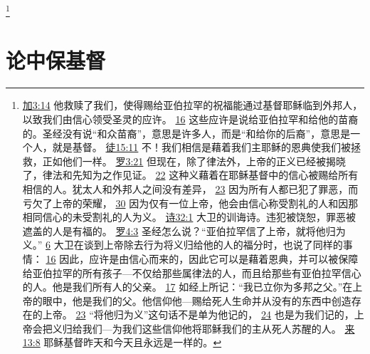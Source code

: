 \documentclass[12pt, a4paper, oneside]{ctexart}
\begin{document}
	\footnote {
		\href{https://biblehub.com/galatians/3-14.htm}{加3:14} 他救赎了我们，使得赐给亚伯拉罕的祝福能通过基督耶稣临到外邦人，以致我们由信心领受圣灵的应许。
		\href{https://biblehub.com/galatians/3-16.htm}{16} 这些应许是说给亚伯拉罕和给他的苗裔的。圣经没有说“和众苗裔”，意思是许多人，而是“和给你的后裔”，意思是一个人，就是基督。
		\href{https://biblehub.com/acts/15-11.htm}{徒15:11} 不！我们相信是藉着我们主耶稣的恩典使我们被拯救，正如他们一样。
		\href{https://biblehub.com/romans/3-21.htm}{罗3:21} 但现在，除了律法外，上帝的正义已经被揭晓了，律法和先知为之作见证。
		\href{https://biblehub.com/romans/3-22.htm}{22} 这种义藉着在耶稣基督中的信心被赐给所有相信的人。犹太人和外邦人之间没有差异，
		\href{https://biblehub.com/romans/3-23.htm}{23} 因为所有人都已犯了罪恶，而亏欠了上帝的荣耀，
		\href{https://biblehub.com/romans/3-30.htm}{30} 因为仅有一位上帝，他会由信心称受割礼的人和因那相同信心的未受割礼的人为义。
		\href{https://biblehub.com/psalms/32-1.htm}{诗32:1} 大卫的训诲诗。违犯被饶恕，罪恶被遮盖的人是有福的。
		\href{https://biblehub.com/romans/4-3.htm}{罗4:3} 圣经怎么说？“亚伯拉罕信了上帝，就将他归为义。”
		\href{https://biblehub.com/romans/4-6.htm}{6} 大卫在谈到上帝除去行为将义归给他的人的福分时，也说了同样的事情：
		\href{https://biblehub.com/romans/4-16.htm}{16} 因此，应许是由信心而来的，因此它可以是藉着恩典，并可以被保障给亚伯拉罕的所有孩子---不仅给那些属律法的人，而且给那些有亚伯拉罕信心的人。他是我们所有人的父亲。
		\href{https://biblehub.com/romans/4-17.htm}{17} 如经上所记：“我已立你为多邦之父。”在上帝的眼中，他是我们的父。他信仰他---赐给死人生命并从没有的东西中创造存在的上帝。
		\href{https://biblehub.com/romans/4-23.htm}{23} “将他归为义”这句话不是单为他记的，
		\href{https://biblehub.com/romans/4-24.htm}{24} 也是为我们记的，上帝会把义归给我们---为我们这些信仰他将耶稣我们的主从死人苏醒的人。
		\href{https://biblehub.com/hebrews/13-8.htm}{来13:8} 耶稣基督昨天和今天且永远是一样的。
	}

\section{论中保基督}
\end{document}
